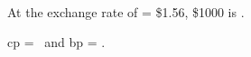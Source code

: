 \chardef{}
\chardef{}
\cp\ \uppercase\expandafter{\romannumeral\year}\par
At the exchange rate of  = \$1.56, \$1000 is .\par
cp = \the\cp\ and bp = \meaning\bp.
\bye
